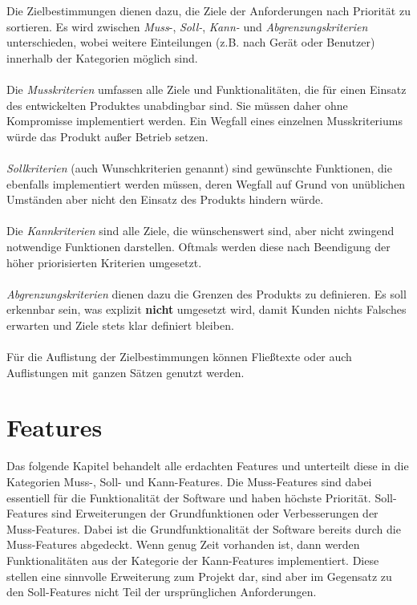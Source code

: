 \begin{tcolorbox}
Die Zielbestimmungen dienen dazu, die Ziele der Anforderungen nach Priorität zu sortieren. 
Es wird zwischen \textit{Muss}-, \textit{Soll-}, \textit{Kann-} und \textit{Abgrenzungskriterien} unterschieden, wobei weitere Einteilungen (z.B. nach Gerät oder Benutzer) innerhalb der Kategorien möglich sind.
%
\\\\
%
Die \textit{Musskriterien} umfassen alle Ziele und Funktionalitäten, die für einen Einsatz des entwickelten Produktes unabdingbar sind.
Sie müssen daher ohne Kompromisse implementiert werden.
Ein Wegfall eines einzelnen Musskriteriums würde das Produkt außer Betrieb setzen.
%
\\\\
%
\textit{Sollkriterien} (auch Wunschkriterien genannt) sind gewünschte Funktionen, die ebenfalls implementiert werden müssen, deren Wegfall auf Grund von unüblichen Umständen aber nicht den Einsatz des Produkts hindern würde.
%
\\\\
%
Die \textit{Kannkriterien} sind alle Ziele, die wünschenswert sind, aber nicht zwingend notwendige Funktionen darstellen. 
Oftmals werden diese nach Beendigung der höher priorisierten Kriterien umgesetzt.
%
\\\\
%
\textit{Abgrenzungskriterien} dienen dazu die Grenzen des Produkts zu definieren.
Es soll erkennbar sein, was explizit \textbf{nicht} umgesetzt wird, damit Kunden nichts Falsches erwarten und Ziele stets klar definiert bleiben.
%
\\\\
%
Für die Auflistung der Zielbestimmungen können Fließtexte oder auch Auflistungen mit ganzen Sätzen genutzt werden. 
\end{tcolorbox}

\section{Features}
Das folgende Kapitel behandelt alle erdachten Features und unterteilt diese in die Kategorien Muss-, Soll- und Kann-Features. 
Die Muss-Features sind dabei essentiell für die Funktionalität der Software und haben höchste Priorität.
Soll-Features sind Erweiterungen der Grundfunktionen oder Verbesserungen der Muss-Features. Dabei ist die Grundfunktionalität der Software bereits durch die Muss-Features abgedeckt.
Wenn genug Zeit vorhanden ist, dann werden Funktionalitäten aus der Kategorie der Kann-Features implementiert. 
Diese stellen eine sinnvolle Erweiterung zum Projekt dar, sind aber im Gegensatz zu den Soll-Features nicht Teil der ursprünglichen Anforderungen.
